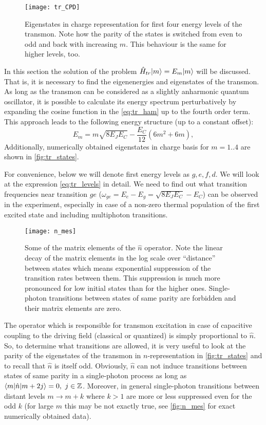 \documentclass[12pt, twoside]{report}
\DeclarePairedDelimiter\bra{\langle}{\rvert}
\DeclarePairedDelimiter\ket{\lvert}{\rangle}
\numberwithin{equation}{section}
\begin{document}
\begin{figure}
\centering
\texttt{[image: tr\_CPD]}
\caption{Eigenstates in charge representation for first four energy levels of the transmon. Note how the parity of the states is switched from even to odd and back with increasing $m$. This behaviour is the same for higher levels, too.}
\label{fig:tr_states}
\end{figure}

In this section the solution of the problem $\hat H_{tr} \ket{m} = E_m \ket{m}$ will be discussed. That is, it is necessary to find the eigenenergies and eigenstates of the transmon. As long as the transmon can be considered as a slightly anharmonic quantum oscillator, it is possible to calculate its energy spectrum perturbatively by expanding the cosine function in the \eqref{eq:tr_ham} up to the fourth order term. This approach leads\cite{Koch2007} to the following energy structure (up to a constant offset):
\begin{equation}
E_m = m \sqrt{8E_J E_C} -\frac{E_C}{12}(6m^2+6m),
\label{eq:tr_levels}
\end{equation}
Additionally, numerically obtained eigenstates in charge basis for $m=1..4$ are shown in \autoref{fig:tr_states}.

For convenience, below we will denote first energy levels as $g,e,f,d$. We will look at the expression \eqref{eq:tr_levels} in detail. We need to find out what transition frequencies near transition $ge$ ($\omega_{ge} = E_e - E_g = \sqrt{8E_J E_C} - E_C$) can be observed in the experiment, especially in case of a non-zero thermal population of the first excited state and including multiphoton transitions. 

\begin{figure}
\centering
\texttt{[image: n\_mes]}
\caption{Some of the matrix elements of the $\hat n$ operator. Note the linear decay of the matrix elements in the log scale over ``distance'' between states which means exponential suppression of the transition rates between them. This suppression is much more pronounced for low initial states than for the higher ones. Single-photon transitions between states of same parity are forbidden and their matrix elements are zero.}
\label{fig:n_mes}
\end{figure}

The operator which is responsible for transmon excitation in case of capacitive coupling to the driving field (classical or quantized) is simply proportional to $\hat n$\cite{Koch2007}. So, to determine what transitions are allowed, it is very useful to look at the parity of the eigenstates of the transmon in $n$-representation in \autoref{fig:tr_states} and to recall that $\hat n$ is itself odd. Obviously, $\hat n$ can not induce transitions between states of same parity in a single-photon process as long as $\bra{m}\hat n\ket{m+2j} = 0,\ j\in\mathbb{Z}$. Moreover, in general single-photon transitions between distant levels $m\rightarrow m+k$ where $k>1$ are more or less suppressed\cite{Bishop2010} even for the odd $k$ (for large $m$ this may be not exactly true, see \autoref{fig:n_mes} for exact numerically obtained data). 
\end{document}
